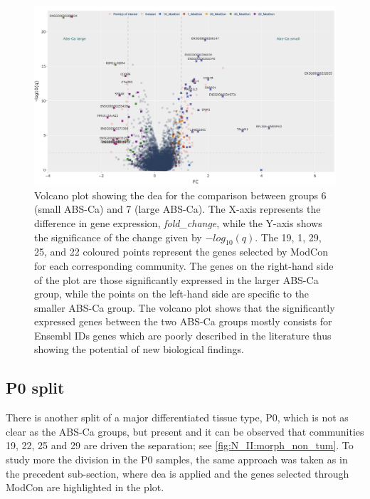 \begin{figure}   
    \centering
    \includegraphics[width=1.0\textwidth,height=1.0\textheight,keepaspectratio]{Sections/Network_II/resources/non_tum/diff_split_dea.png}
    \caption[Volcano plot - ABS-Ca splits comparison]{Volcano plot showing the \acrlong{dea} for the comparison between groups 6 (small ABS-Ca) and 7 (large ABS-Ca). The X-axis represents the difference in gene expression, \textit{fold\_change}, while the Y-axis shows the significance of the change given by $-log_{10}(q)$. The 19, 1, 29, 25, and 22 coloured points represent the genes selected by ModCon for each corresponding community. The genes on the right-hand side of the plot are those significantly expressed in the larger ABS-Ca group, while the points on the left-hand side are specific to the smaller ABS-Ca group. The volcano plot shows that the significantly expressed genes between the two ABS-Ca groups mostly consists for Ensembl IDs genes which are poorly described in the literature thus showing the potential of new biological findings.}
    \label{fig:N_II:diff_split}
\end{figure}


\subsection{P0 split} \label{s:N_II:p0_split}

There is another split of a major differentiated tissue type, P0,  which is not as clear as the ABS-Ca groups, but present and it can be observed that communities 19, 22, 25 and 29 are driven the separation; see \cref{fig:N_II:morph_non_tum}. To study more the division in the P0 samples, the same approach was taken as in the precedent sub-section, where \acrshort{dea} is applied and the genes selected through ModCon are highlighted in the plot.

